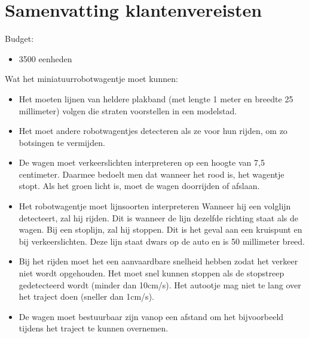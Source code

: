 \documentclass{article}
\begin{document}
	\section*{Samenvatting klantenvereisten}
	Budget: 
	\begin{itemize}
		\item 3500 eenheden
	\end{itemize}
	Wat het miniatuurrobotwagentje moet kunnen: 
	\begin{itemize}
		\item Het moeten lijnen van heldere plakband (met lengte 1 meter en breedte 25 millimeter) volgen die straten voorstellen in een modelstad.
		\item Het moet andere robotwagentjes detecteren als ze voor hun rijden, om zo botsingen te vermijden.
		\item De wagen moet verkeerslichten interpreteren op een hoogte van 7,5 centimeter. Daarmee bedoelt men dat wanneer het rood is, het wagentje stopt. Als het groen licht is, moet de wagen doorrijden of afslaan.
		\item Het robotwagentje moet lijnsoorten interpreteren
		\subitem Wanneer hij een volglijn detecteert, zal hij rijden. Dit is wanneer de lijn dezelfde richting staat als de wagen.
		\subitem Bij een stoplijn, zal hij stoppen. Dit is het geval aan een kruispunt en bij verkeerslichten. Deze lijn staat dwars op de auto en is 50 millimeter breed.
		\item Bij het rijden moet het een aanvaardbare snelheid hebben zodat het verkeer niet wordt opgehouden.
		\subitem Het moet snel kunnen stoppen als de stopstreep gedetecteerd wordt (minder dan 10cm/s).
		\subitem Het autootje mag niet te lang over het traject doen (sneller dan 1cm/s).
		\item De wagen moet bestuurbaar zijn vanop een afstand om het bijvoorbeeld tijdens het traject te kunnen overnemen.
	\end{itemize}
	
	
	
	
	
	
	
	
	
	
	
\end{document}
